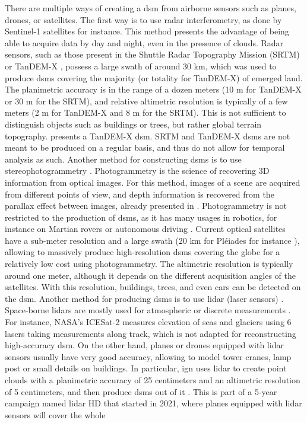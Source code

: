 There are multiple ways of creating a \acrshort{dsm} from airborne sensors such as planes, drones, or satellites. The first way is to use \acrshort{radar} interferometry, as done by Sentinel-1 satellites \cite{geudtner_sentinel-1_2014} for instance. This method presents the advantage of being able to acquire data by day and night, even in the presence of clouds. Radar sensors, such as those present in the Shuttle Radar Topography Mission (SRTM) \cite{farr_shuttle_2007} or TanDEM-X \cite{krieger_tandem-x_2007}, possess a large swath of around $30$ km, which was used to produce \acrshort{dsm}s covering the majority (or totality for TanDEM-X) of emerged land. The planimetric accuracy is in the range of a dozen meters (10 m for TanDEM-X or 30 m for the SRTM), and relative altimetric resolution is typically of a few meters (2 m for TanDEM-X and 8 m for the SRTM). This is not sufficient to distinguish objects such as buildings or trees, but rather global terrain topography.  presents a TanDEM-X \acrshort{dsm}. SRTM and TanDEM-X \acrshort{dsm}s are not meant to be produced on a regular basis, and thus do not allow for temporal analysis as such. Another method for constructing \acrshort{dsm}s is to use stereophotogrammetry \cite{tao_comprehensive_2001}. Photogrammetry is the science of recovering 3D information from optical images. For this method, images of a scene are acquired from different points of view, and depth information is recovered from the parallax effect between images, already presented in . Photogrammetry is not restricted to the production of \acrshort{dsm}s, as it has many usages in robotics, for instance on Martian rovers \cite{goldberg_stereo_2002} or autonomous driving \cite{geiger_vision_2013}. Current optical satellites have a sub-meter resolution and a large swath (20 km for Pléiades for instance \cite{coeurdevey_pleiades_2012}), allowing to massively produce high-resolution \acrshort{dsm}s covering the globe for a relatively low cost using photogrammetry. The altimetric resolution is typically around one meter, although it depends on the different acquisition angles of the satellites. With this resolution, buildings, trees, and even cars can be detected on the \acrshort{dsm}. Another method for producing \acrshort{dsm}s is to use \acrshort{lidar} (laser sensors) \cite{khosravipour_generating_2016}. Space-borne \acrshort{lidar}s are mostly used for atmospheric or discrete measurements \cite{fouladinejad_history_2019}. For instance, NASA’s ICESat-2 \cite{jasinski_atlasicesat-2_2020} measures elevation of seas and glaciers using 6 lasers taking measurements along track, which is not adapted for reconstructing high-accuracy \acrshort{dsm}. On the other hand, planes or drones equipped with \acrshort{lidar} sensors usually have very good accuracy, allowing to model tower cranes, lamp post or small details on buildings. In particular, \acrshort{ign} uses \acrshort{lidar} to create point clouds with a planimetric accuracy of 25 centimeters and an altimetric resolution of 5 centimeters, and then produce \acrshort{dsm}s out of it  \cite{monnet_lidarhd_2023, ign_lidar_2024}. This is part of a 5-year campaign named \acrshort{lidar} HD that started in 2021, where planes equipped with \acrshort{lidar} sensors will cover the whole 